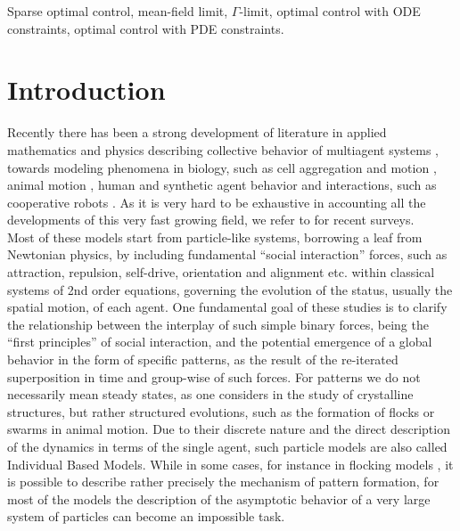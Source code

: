 \documentclass[11pt]{article}
\theoremstyle{plain}
\theoremstyle{definition}
\theoremstyle{remark}
\numberwithin{equation}{section}
\begin{document}
 Sparse optimal control, mean-field limit, $\Gamma$-limit, optimal control with ODE constraints, optimal control with PDE constraints.

\section{Introduction}

Recently there has been a strong development of literature in applied mathematics and physics describing collective behavior of 
multiagent systems \cite{CuckerDong11,cucker-mordecki,CucSma07,GC04, MR2000132,KeMinAuWan02,vicsek}, towards modeling phenomena in biology, such as cell aggregation and motion \cite{CDFSTB03,kese70,KocWhi98,be07},  animal motion \cite{BCCCCGLOPPVZ09,MR2507454,ChuDorMarBerCha07,crpito10,CouFra02,CKFL05,CucSma07,Niw94,PE99,ParVisGru02,Rom96,TonTu95,YEECBKMS09}, human \cite{crpito11,CucSmaZho04,MR2438215} and synthetic agent behavior and interactions, such as 
cooperative robots \cite{ChuHuaDorBer07,LeoFio01,PerGomElo09,SugSan97}. As it is very hard to be exhaustive in accounting all the developments of this very fast growing
field, we refer to \cite{CCH13,cafotove10,viza12}  for recent surveys.\\
Most of these models start from particle-like systems, borrowing a leaf from Newtonian physics, by including fundamental ``social interaction'' forces, such as attraction, repulsion,
self-drive, orientation and alignment etc. within classical systems of 2nd order equations, governing the evolution of the status, usually the spatial motion, of each agent. 
One fundamental goal of these studies is to clarify the relationship between the interplay of such simple binary forces, being the ``first principles'' of
social interaction, and the potential emergence  of a global behavior in the form of specific patterns, as the result of the re-iterated superposition in time and group-wise
of such forces. For patterns we do not necessarily mean steady states, as one considers in the study of crystalline structures, but rather structured evolutions, such
as the formation of flocks or swarms in animal motion. Due to their discrete nature and the direct description of the dynamics in terms of the single agent, such
particle models are also called Individual Based Models. While in some cases, for instance in flocking models \cite{CucSma07,cusm07}, it is possible to describe rather precisely
the mechanism of pattern formation, for most of the models the description of the asymptotic behavior of a very large system of particles can become an impossible task.
\end{document}
